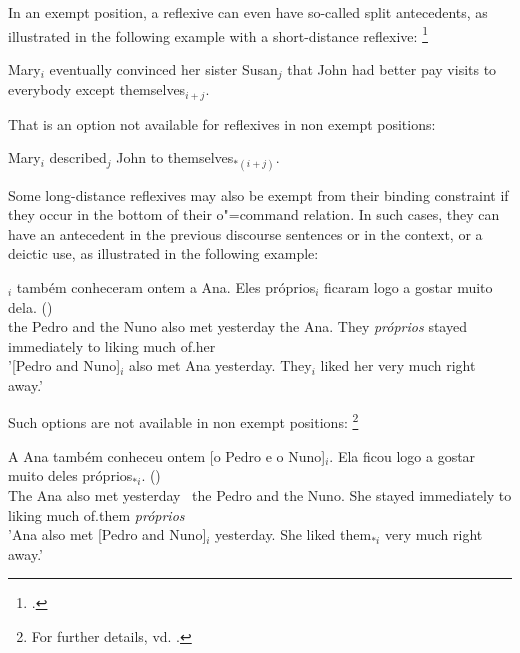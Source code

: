 \documentclass[output=paper
	        ,collection
	        ,collectionchapter
 	        ,biblatex
                ,babelshorthands
                ,newtxmath
                ,draftmode
                ,colorlinks, citecolor=brown
]{langscibook}
\begin{document}
In an exempt position, a reflexive can even have so-called
split antecedents, as illustrated in the following example
with a short-distance reflexive:%
%
\footnote{
\citep[]{zribi:pview89}. 

}
%

\begin{exe}
\ex Mary$_{i}$ eventually convinced her sister Susan$_{j}$ that John had better 
pay visits to everybody except themselves$_{i+j}$.
\end{exe}

That is an option not available for reflexives in non exempt positions:

\begin{exe}
\ex Mary$_{i}$ described$_{j}$ John to themselves$_{*(i+j)}$.
\end{exe}


Some long-distance reflexives may also be exempt from their binding constraint if
they occur in the bottom of their o"=command relation. In such cases, they
can have an antecedent in the previous discourse sentences or
in the context, or a deictic use, as illustrated in the following example:


\begin{exe}
\ex
{}$_{i}$ tamb\'{e}m conheceram ontem a Ana. Eles pr\'{o}prios$_{i}$
ficaram logo a gostar muito dela. ()\\ 
the Pedro and the Nuno also met yesterday the Ana. They {\em pr\'{o}prios} stayed immediately to
liking much of.her\\
\trans '[Pedro and Nuno]$_{i}$ also met Ana yesterday. They$_{i}$ liked her very much right
away.'
\end{exe}

Such options are not available in non exempt positions:%
%
\footnote{
For further details, vd. \citep{branco:ldrefl99}.
}
%


\begin{exe}
\label{portugueseLDreflexive}
\ex
\gll  A Ana tamb\'{e}m conheceu ontem [o Pedro e o Nuno]$_{i}$. Ela ficou logo a gostar muito
deles pr\'{o}prios$_{*i}$. ()\\ 
The Ana also met yesterday \mbox{ }the Pedro and the Nuno. She stayed immediately to liking much of.them
{\em pr\'{o}prios}\\
\trans 'Ana also met [Pedro and Nuno]$_{i}$ yesterday. She liked them$_{*i}$ very much right
away.'
\end{exe}
\end{document}

